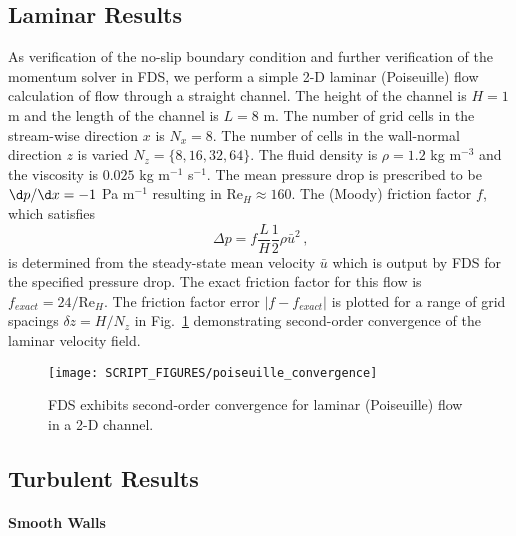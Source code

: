 \documentclass[11pt]{book}
\begin{document}
\subsection{Laminar Results}
\label{laminar}

As verification of the no-slip boundary condition and further verification of the momentum solver in FDS, we perform a simple 2-D laminar (Poiseuille) flow calculation of
flow through a straight channel.
The height of the channel is $H=1$ m and the length of the channel is $L=8$ m.
The number of grid cells in the stream-wise direction $x$ is $N_x = 8$.  The number of cells in the wall-normal direction $z$ is varied $N_z = \{8,16,32,64\}$.
The fluid density is $\rho = 1.2$ kg m$^{-3}$ and the viscosity is $0.025$ kg m$^{-1}$ s$^{-1}$.
The mean pressure drop is prescribed to be $\d p/ \d x = -1$ Pa m$^{-1}$ resulting in Re$_H \approx 160$.  The (Moody) friction factor $f$, which satisfies
\begin{equation}
\label{eqn_moodyf}
\Delta p = f \frac{L}{H} \frac{1}{2} \rho \bar{u}^2 \,\mbox{,}
\end{equation}
is determined from the steady-state mean velocity $\bar{u}$ which is output by FDS for the specified pressure drop.  The exact friction factor for this flow is $f_{exact} = 24/\mbox{Re}_H$.  The friction factor error $|f-f_{exact}|$ is plotted for a range of grid spacings $\delta z = H/N_z$ in Fig.~\ref{fig_poiseuille_convergence} demonstrating second-order convergence of the laminar velocity field.
\begin{figure}
\centering
\texttt{[image: SCRIPT\_FIGURES/poiseuille\_convergence]}
\caption[Convergence for laminar (Poiseuille) flow in a 2-D channel]{FDS exhibits second-order convergence for laminar (Poiseuille) flow in a 2-D channel.}
\label{fig_poiseuille_convergence}
\end{figure}

\subsection{Turbulent Results}
\label{turbulent}

\paragraph{Smooth Walls}
\end{document}

